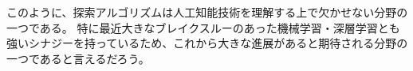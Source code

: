 このように、探索アルゴリズムは人工知能技術を理解する上で欠かせない分野の一つである。
特に最近大きなブレイクスルーのあった機械学習・深層学習とも強いシナジーを持っているため、これから大きな進展があると期待される分野の一つであると言えるだろう。


\begin{comment}
\section{アルゴリズムの概略図}
\label{sec:cheatsheet}

ここでは大まかに問題の特徴に対してどのようなアルゴリズムを最初に試すべきかの概略を示す。
ここで紹介する手法が常に優れているわけではない。が、最初に考慮する価値はあるだろう。
つまり、ここではその問題に当てはまらないとされた手法だからといって有用ではないということはない。
各章を読んでみて、適用可能かを読んでみたい。

\begin{enumerate}
\item 同じ状態に至る経路がたくさんある
	\begin{enumerate}
	\item YES: グラフ探索アルゴリズム
	\item NO: 木探索アルゴリズム (e.g. IDA*)
	\item SOSO: IDA* with transposition table
	\end{enumerate}
	
\item 問題の特徴がある程度分かっておりヒューリスティック関数が作れる
	\begin{enumerate}
	\item YES: ヒューリスティック探索
	\item NO: ブラインド探索
	\end{enumerate}

\item 最適解ではなくある程度良い解なら十分である
	\begin{enumerate}
	\item YES: 局所探索、weighted A*
	\item NO: A*
	\end{enumerate}

\item 最適解と比べてどのくらい良い解かの保証が必要である
	\begin{enumerate}
	\item YES: weighted A*
	\item NO: Greedy best first search
	\end{enumerate}


\end{comment}
